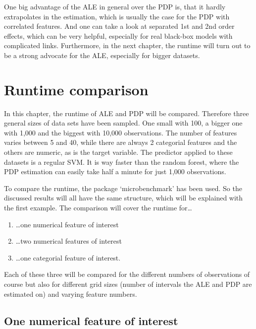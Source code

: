 \documentclass[
]{krantz}
\providecommand{\tightlist}{%
  \setlength{\itemsep}{0pt}\setlength{\parskip}{0pt}}
\begin{document}
One big advantage of the ALE in general over the PDP is, that it hardly extrapolates in the estimation, which is usually the case for the PDP with correlated features. And one can take a look at separated 1st and 2nd order effects, which can be very helpful, especially for real black-box models with complicated links. Furthermore, in the next chapter, the runtime will turn out to be a strong advocate for the ALE, especially for bigger datasets.

\hypertarget{runtime-comparison}{%
\section{Runtime comparison}\label{runtime-comparison}}

In this chapter, the runtime of ALE and PDP will be compared. Therefore three general sizes of data sets have been sampled. One small with 100, a bigger one with 1,000 and the biggest with 10,000 observations. The number of features varies between 5 and 40, while there are always 2 categorial features and the others are numeric, as is the target variable. The predictor applied to these datasets is a regular SVM. It is way faster than the random forest, where the PDP estimation can easily take half a minute for just 1,000 observations.

To compare the runtime, the package `microbenchmark' has been used. So the discussed results will all have the same structure, which will be explained with the first example.
The comparison will cover the runtime for\ldots{}

\begin{enumerate}
\def\labelenumi{\arabic{enumi}.}
\tightlist
\item
  \ldots one numerical feature of interest
\item
  \ldots two numerical features of interest
\item
  \ldots one categorial feature of interest.
\end{enumerate}

Each of these three will be compared for the different numbers of observations of course but also for different grid sizes (number of intervals the ALE and PDP are estimated on) and varying feature numbers.

\hypertarget{one-numerical-feature-of-interest}{%
\subsection{One numerical feature of interest}\label{one-numerical-feature-of-interest}}
\end{document}
